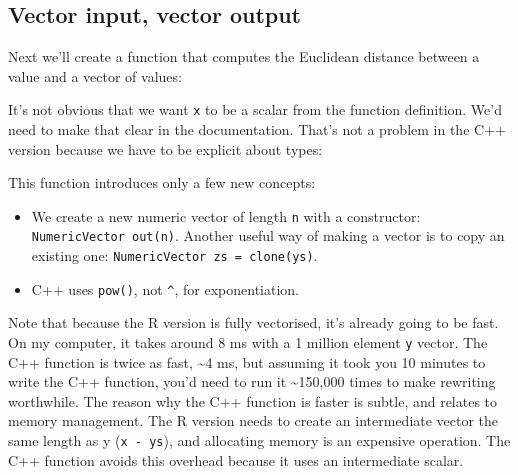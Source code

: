\hypertarget{vector-input-vector-output}{%
\subsection{Vector input, vector
output}\label{vector-input-vector-output}}

Next we'll create a function that computes the Euclidean distance
between a value and a vector of values:

\begin{Shaded}
\begin{Highlighting}[]
\StringTok{ }
  \OperatorTok{-}\StringTok{ }\OperatorTok{^}\StringTok{ }\NormalTok{)}
\NormalTok{\}}
\end{Highlighting}
\end{Shaded}

It's not obvious that we want \texttt{x} to be a scalar from the
function definition. We'd need to make that clear in the documentation.
That's not a problem in the C++ version because we have to be explicit
about types:

\begin{Shaded}
\begin{Highlighting}[]
\NormalTok{(}

\StringTok{  \}}
\NormalTok{)}
\end{Highlighting}
\end{Shaded}

This function introduces only a few new concepts:

\begin{itemize}
\item
  We create a new numeric vector of length \texttt{n} with a
  constructor: \texttt{NumericVector\ out(n)}. Another useful way of
  making a vector is to copy an existing one:
  \texttt{NumericVector\ zs\ =\ clone(ys)}.
\item
  C++ uses \texttt{pow()}, not \texttt{\^{}}, for exponentiation.
\end{itemize}

Note that because the R version is fully vectorised, it's already going
to be fast. On my computer, it takes around 8 ms with a 1 million
element \texttt{y} vector. The C++ function is twice as fast,
\textasciitilde{}4 ms, but assuming it took you 10 minutes to write the
C++ function, you'd need to run it \textasciitilde{}150,000 times to
make rewriting worthwhile. The reason why the C++ function is faster is
subtle, and relates to memory management. The R version needs to create
an intermediate vector the same length as y (\texttt{x\ -\ ys}), and
allocating memory is an expensive operation. The C++ function avoids
this overhead because it uses an intermediate scalar.

